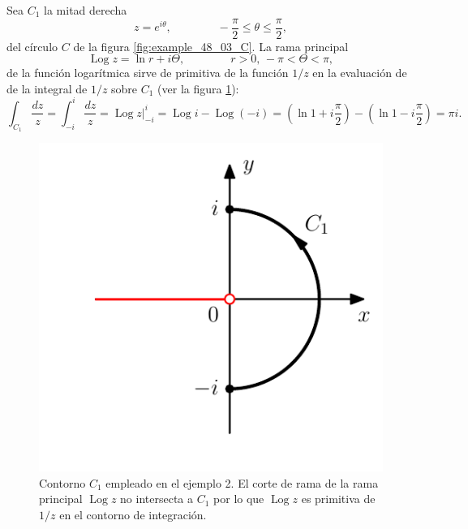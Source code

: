 \documentclass[a4paper]{report}
\DeclareMathOperator{\Log}{Log}
\begin{document}
Sea \(C_1\) la mitad derecha
\[
 z=e^{i\theta},
 \qquad\qquad 
 -\frac{\pi}{2}\leq\theta\leq\frac{\pi}{2},
\]
del círculo \(C\) de la figura \ref{fig:example_48_03_C}. La rama principal 
\[
 \Log z=\ln r+i\Theta,
 \qquad\qquad 
 r>0,\,-\pi<\Theta<\pi,
\]
de la función logarítmica sirve de primitiva de la función \(1/z\) en la evaluación de de la integral de \(1/z\) sobre \(C_1\) (ver la figura \ref{fig:example_48_03_C1}):
\[
 \int_{C_1}\frac{dz}{z}=\int_{-i}^i\frac{dz}{z}=\Log z\bigg|_{-i}^i=\Log i-\Log(-i)
 =\left(\ln1+i\frac{\pi}{2}\right)-\left(\ln1-i\frac{\pi}{2}\right)=\pi i.
\]
\begin{figure}[!htb]
  \begin{minipage}[c]{0.35\textwidth}
    \includegraphics[width=\textwidth]{figuras/example_48_03_C1.pdf}
  \end{minipage}\hfill
  \begin{minipage}[c]{0.55\textwidth}
    \caption{
        Contorno \(C_1\) empleado en el ejemplo 2. El corte de rama de la rama principal \(\Log z\) no intersecta a \(C_1\) por lo que \(\Log z\) es primitiva de \(1/z\) en el contorno de integración.
    }\label{fig:example_48_03_C1}
  \end{minipage}
\end{figure}
\end{document}
